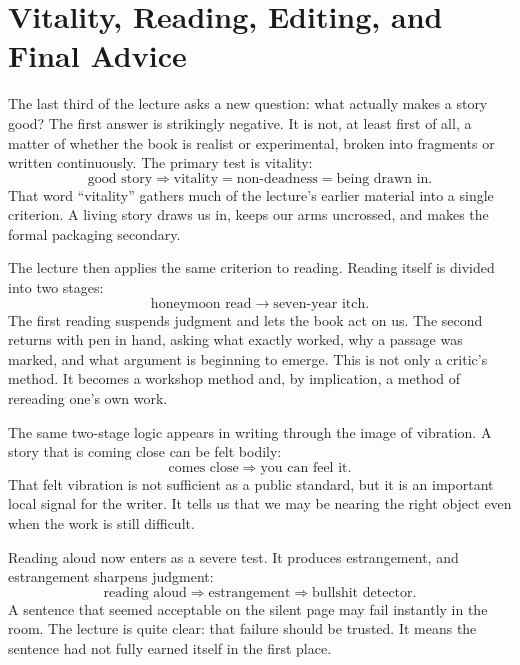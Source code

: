\section{Vitality, Reading, Editing, and Final Advice}

The last third of the lecture asks a new question: what actually makes a story good? The first answer is strikingly negative. It is not, at least first of all, a matter of whether the book is realist or experimental, broken into fragments or written continuously. The primary test is vitality:
\begin{equation}
\text{good story} \Rightarrow \text{vitality} = \text{non-deadness} = \text{being drawn in}.
\end{equation}
That word ``vitality'' gathers much of the lecture's earlier material into a single criterion. A living story draws us in, keeps our arms uncrossed, and makes the formal packaging secondary.

The lecture then applies the same criterion to reading. Reading itself is divided into two stages:
\begin{equation}
\text{honeymoon read} \to \text{seven-year itch}.
\end{equation}
The first reading suspends judgment and lets the book act on us. The second returns with pen in hand, asking what exactly worked, why a passage was marked, and what argument is beginning to emerge. This is not only a critic's method. It becomes a workshop method and, by implication, a method of rereading one's own work.

The same two-stage logic appears in writing through the image of vibration. A story that is coming close can be felt bodily:
\begin{equation}
\text{comes close} \Rightarrow \text{you can feel it}.
\end{equation}
That felt vibration is not sufficient as a public standard, but it is an important local signal for the writer. It tells us that we may be nearing the right object even when the work is still difficult.

Reading aloud now enters as a severe test. It produces estrangement, and estrangement sharpens judgment:
\begin{equation}
\text{reading aloud} \Rightarrow \text{estrangement} \Rightarrow \text{bullshit detector}.
\end{equation}
A sentence that seemed acceptable on the silent page may fail instantly in the room. The lecture is quite clear: that failure should be trusted. It means the sentence had not fully earned itself in the first place.

